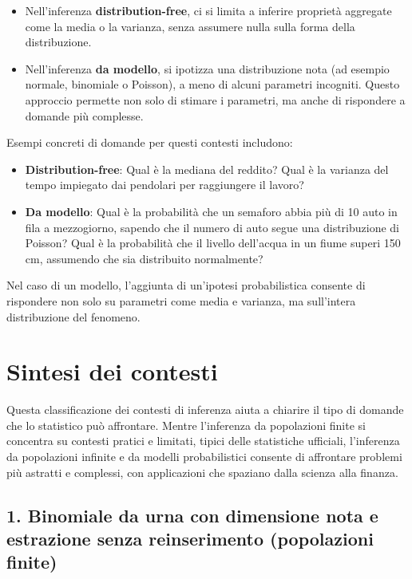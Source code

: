 \documentclass[
  11pt,
]{book}
\providecommand{\tightlist}{%
  \setlength{\itemsep}{0pt}\setlength{\parskip}{0pt}}
\theoremstyle{mytheoremstyle}
\theoremstyle{mydefstyle}
\begin{document}
\begin{itemize}
\tightlist
\item
  Nell'inferenza \textbf{distribution-free}, ci si limita a inferire proprietà aggregate come la media o la varianza, senza assumere nulla sulla forma della distribuzione.
\item
  Nell'inferenza \textbf{da modello}, si ipotizza una distribuzione nota (ad esempio normale, binomiale o Poisson), a meno di alcuni parametri incogniti. Questo approccio permette non solo di stimare i parametri, ma anche di rispondere a domande più complesse.
\end{itemize}

Esempi concreti di domande per questi contesti includono:

\begin{itemize}
\tightlist
\item
  \textbf{Distribution-free}: Qual è la mediana del reddito? Qual è la varianza del tempo impiegato dai pendolari per raggiungere il lavoro?
\item
  \textbf{Da modello}: Qual è la probabilità che un semaforo abbia più di 10 auto in fila a mezzogiorno, sapendo che il numero di auto segue una distribuzione di Poisson? Qual è la probabilità che il livello dell'acqua in un fiume superi 150 cm, assumendo che sia distribuito normalmente?
\end{itemize}

Nel caso di un modello, l'aggiunta di un'ipotesi probabilistica consente di rispondere non solo su parametri come media e varianza, ma sull'intera distribuzione del fenomeno.

\section{Sintesi dei contesti}\label{sintesi-dei-contesti}

Questa classificazione dei contesti di inferenza aiuta a chiarire il tipo di domande che lo statistico può affrontare. Mentre l'inferenza da popolazioni finite si concentra su contesti pratici e limitati, tipici delle statistiche ufficiali, l'inferenza da popolazioni infinite e da modelli probabilistici consente di affrontare problemi più astratti e complessi, con applicazioni che spaziano dalla scienza alla finanza.

\subsection{1. Binomiale da urna con dimensione nota e estrazione senza reinserimento (popolazioni finite)}\label{binomiale-da-urna-con-dimensione-nota-e-estrazione-senza-reinserimento-popolazioni-finite}
\end{document}
